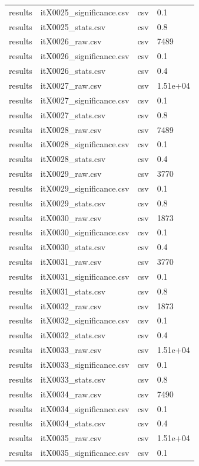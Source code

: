 \begin{landscape}
\begin{longtable}{p{}p{}p{}p{}}
results & itX0025\_significance.csv & csv & 0.1 \\
results & itX0025\_stats.csv & csv & 0.8 \\
results & itX0026\_raw.csv & csv & 7489 \\
results & itX0026\_significance.csv & csv & 0.1 \\
results & itX0026\_stats.csv & csv & 0.4 \\
results & itX0027\_raw.csv & csv & 1.51e+04 \\
results & itX0027\_significance.csv & csv & 0.1 \\
results & itX0027\_stats.csv & csv & 0.8 \\
results & itX0028\_raw.csv & csv & 7489 \\
results & itX0028\_significance.csv & csv & 0.1 \\
results & itX0028\_stats.csv & csv & 0.4 \\
results & itX0029\_raw.csv & csv & 3770 \\
results & itX0029\_significance.csv & csv & 0.1 \\
results & itX0029\_stats.csv & csv & 0.8 \\
results & itX0030\_raw.csv & csv & 1873 \\
results & itX0030\_significance.csv & csv & 0.1 \\
results & itX0030\_stats.csv & csv & 0.4 \\
results & itX0031\_raw.csv & csv & 3770 \\
results & itX0031\_significance.csv & csv & 0.1 \\
results & itX0031\_stats.csv & csv & 0.8 \\
results & itX0032\_raw.csv & csv & 1873 \\
results & itX0032\_significance.csv & csv & 0.1 \\
results & itX0032\_stats.csv & csv & 0.4 \\
results & itX0033\_raw.csv & csv & 1.51e+04 \\
results & itX0033\_significance.csv & csv & 0.1 \\
results & itX0033\_stats.csv & csv & 0.8 \\
results & itX0034\_raw.csv & csv & 7490 \\
results & itX0034\_significance.csv & csv & 0.1 \\
results & itX0034\_stats.csv & csv & 0.4 \\
results & itX0035\_raw.csv & csv & 1.51e+04 \\
results & itX0035\_significance.csv & csv & 0.1 \\

\end{longtable}
\end{landscape}

